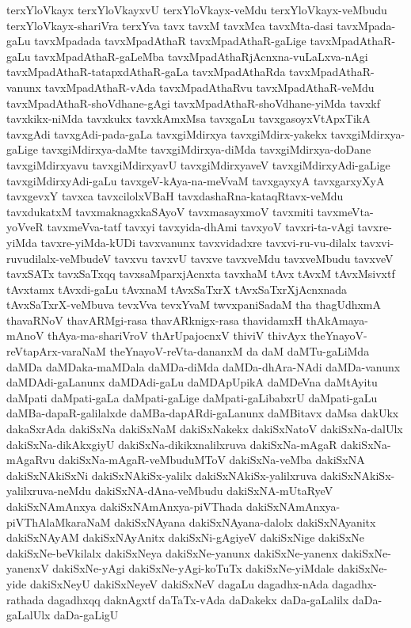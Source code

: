 {terxYloVkayx
terxYloVkayxvU
terxYloVkayx-veMdu
terxYloVkayx-veMbudu
terxYloVkayx-shariVra
terxYva
tavx
tavxM
tavxMca
tavxMta-dasi
tavxMpada-gaLu
tavxMpadada
tavxMpadAthaR
tavxMpadAthaR-gaLige
tavxMpadAthaR-gaLu
tavxMpadAthaR-gaLeMba
tavxMpadAthaRjAcnxna-vuLaLxva-nAgi
tavxMpadAthaR-tatapxdAthaR-gaLa
tavxMpadAthaRda
tavxMpadAthaR-vanunx
tavxMpadAthaR-vAda
tavxMpadAthaRvu
tavxMpadAthaR-veMdu
tavxMpadAthaR-shoVdhane-gAgi
tavxMpadAthaR-shoVdhane-yiMda
tavxkf
tavxkikx-niMda
tavxkukx
tavxkAmxMsa
tavxgaLu
tavxgasoyxVtApxTikA
tavxgAdi
tavxgAdi-pada-gaLa
tavxgiMdirxya
tavxgiMdirx-yakekx
tavxgiMdirxya-gaLige
tavxgiMdirxya-daMte
tavxgiMdirxya-diMda
tavxgiMdirxya-doDane
tavxgiMdirxyavu
tavxgiMdirxyavU
tavxgiMdirxyaveV
tavxgiMdirxyAdi-gaLige
tavxgiMdirxyAdi-gaLu
tavxgeV-kAya-na-meVvaM
tavxgayxyA
tavxgarxyXyA
tavxgevxY
tavxca
tavxcilolxVBaH
tavxdashaRna-kataqRtavx-veMdu
tavxdukatxM
tavxmaknagxkaSAyoV
tavxmasayxmoV
tavxmiti
tavxmeVta-yoVveR
tavxmeVva-tatf
tavxyi
tavxyida-dhAmi
tavxyoV
tavxri-ta-vAgi
tavxre-yiMda
tavxre-yiMda-kUDi
tavxvanunx
tavxvidadxre
tavxvi-ru-vu-dilalx
tavxvi-ruvudilalx-veMbudeV
tavxvu
tavxvU
tavxve
tavxveMdu
tavxveMbudu
tavxveV
tavxSATx
tavxSaTxqq
tavxsaMparxjAcnxta
tavxhaM
tAvx
tAvxM
tAvxMsivxtf
tAvxtamx
tAvxdi-gaLu
tAvxnaM
tAvxSaTxrX
tAvxSaTxrXjAcnxnada
tAvxSaTxrX-veMbuva
tevxVva
tevxYvaM
twvxpaniSadaM
tha
thagUdhxmA
thavaRNoV
thavARMgi-rasa
thavARknigx-rasa
thavidamxH
thAkAmaya-mAnoV
thAya-ma-shariVroV
thArUpajocnxV
thiviV
thivAyx
theYnayoV-reVtapArx-varaNaM
theYnayoV-reVta-dananxM
da
daM
daMTu-gaLiMda
daMDa
daMDaka-maMDala
daMDa-diMda
daMDa-dhAra-NAdi
daMDa-vanunx
daMDAdi-gaLanunx
daMDAdi-gaLu
daMDApUpikA
daMDeVna
daMtAyitu
daMpati
daMpati-gaLa
daMpati-gaLige
daMpati-gaLibabxrU
daMpati-gaLu
daMBa-dapaR-galilalxde
daMBa-dapARdi-gaLanunx
daMBitavx
daMsa
dakUkx
dakaSxrAda
dakiSxNa
dakiSxNaM
dakiSxNakekx
dakiSxNatoV
dakiSxNa-dalUlx
dakiSxNa-dikAkxgiyU
dakiSxNa-dikikxnalilxruva
dakiSxNa-mAgaR
dakiSxNa-mAgaRvu
dakiSxNa-mAgaR-veMbuduMToV
dakiSxNa-veMba
dakiSxNA
dakiSxNAkiSxNi
dakiSxNAkiSx-yalilx
dakiSxNAkiSx-yalilxruva
dakiSxNAkiSx-yalilxruva-neMdu
dakiSxNA-dAna-veMbudu
dakiSxNA-mUtaRyeV
dakiSxNAmAnxya
dakiSxNAmAnxya-piVThada
dakiSxNAmAnxya-piVThAlaMkaraNaM
dakiSxNAyana
dakiSxNAyana-dalolx
dakiSxNAyanitx
dakiSxNAyAM
dakiSxNAyAnitx
dakiSxNi-gAgiyeV
dakiSxNige
dakiSxNe
dakiSxNe-beVkilalx
dakiSxNeya
dakiSxNe-yanunx
dakiSxNe-yanenx
dakiSxNe-yanenxV
dakiSxNe-yAgi
dakiSxNe-yAgi-koTuTx
dakiSxNe-yiMdale
dakiSxNe-yide
dakiSxNeyU
dakiSxNeyeV
dakiSxNeV
dagaLu
dagadhx-nAda
dagadhx-rathada
dagadhxqq
daknAgxtf
daTaTx-vAda
daDakekx
daDa-gaLalilx
daDa-gaLalUlx
daDa-gaLigU
}
